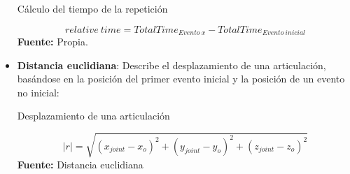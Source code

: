 \begin{itemize}
\begin{formula}[H]
	\centering
	\caption{C\'alculo del tiempo de la repetici\'on}
	\label{frm:relativeTime}
	\begin{equation}
	relative \: time = TotalTime_{Evento\: x}-TotalTime_{Evento\: inicial}
	\end{equation}
		\textbf{Fuente:} Propia.
\end{formula}
\item \textbf{Distancia euclidiana}: Describe el desplazamiento de una articulaci\'on, bas\'andose en la posici\'on del primer evento inicial y la posici\'on de un evento no inicial:
\begin{formula}[H]
	\centering
	\caption{Desplazamiento de una articulaci\'on}
	\label{frm:desplazaUser}
	\begin{equation}
|r|=\sqrt{(x_{joint}-x_{o})^{2}+(y_{joint}-y_{o})^{2}+(z_{joint}-z_{o})^{2}}
	\end{equation}
	\textbf{Fuente:} Distancia euclidiana \cite[p.~423]{ayres2001calculo}
\end{formula}  
\end{itemize}
